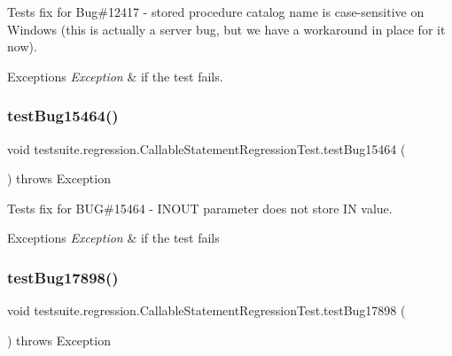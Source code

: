 Tests fix for Bug\#12417 -\/ stored procedure catalog name is case-\/sensitive on Windows (this is actually a server bug, but we have a workaround in place for it now).


\begin{DoxyExceptions}{Exceptions}
{\em Exception} & if the test fails. \\
\hline
\end{DoxyExceptions}
\mbox{\label{classtestsuite_1_1regression_1_1_callable_statement_regression_test_a5448d02b9a24375eb4b2d175d273c20f}} 
\subsubsection{\texorpdfstring{test\+Bug15464()}{testBug15464()}}
{\footnotesize\ttfamily void testsuite.\+regression.\+Callable\+Statement\+Regression\+Test.\+test\+Bug15464 (\begin{DoxyParamCaption}{ }\end{DoxyParamCaption}) throws Exception}

Tests fix for B\+UG\#15464 -\/ I\+N\+O\+UT parameter does not store IN value.


\begin{DoxyExceptions}{Exceptions}
{\em Exception} & if the test fails \\
\hline
\end{DoxyExceptions}
\mbox{\label{classtestsuite_1_1regression_1_1_callable_statement_regression_test_a32278d6baf7013d850879cfd634b38cc}} 
\subsubsection{\texorpdfstring{test\+Bug17898()}{testBug17898()}}
{\footnotesize\ttfamily void testsuite.\+regression.\+Callable\+Statement\+Regression\+Test.\+test\+Bug17898 (\begin{DoxyParamCaption}{ }\end{DoxyParamCaption}) throws Exception}

